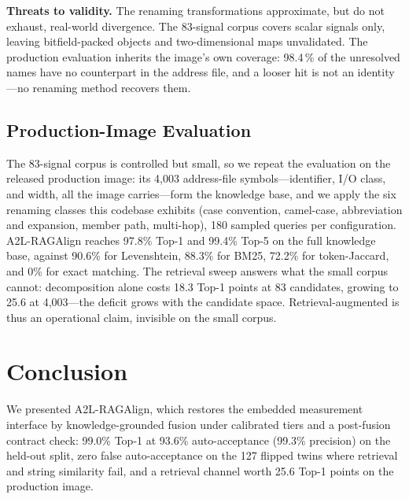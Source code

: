 \documentclass[conference]{IEEEtran}
\newcommand{\toolname}{A2L-RAGAlign}
\begin{document}
\textbf{Threats to validity.} The renaming transformations approximate, but do
not exhaust, real-world divergence. The 83-signal corpus covers scalar signals
only, leaving bitfield-packed objects and two-dimensional maps unvalidated.
The production evaluation inherits the image's own coverage: 98.4\,\% of the
unresolved names have no counterpart in the address file, and a looser hit is
not an identity---no renaming method recovers them.

\subsection{Production-Image Evaluation}
\label{sec:prod}
The 83-signal corpus is controlled but small, so we repeat the evaluation on
the released production image: its 4{,}003 address-file symbols---identifier,
I/O class, and width, all the image carries---form the knowledge base, and we
apply the six renaming classes this codebase exhibits (case convention,
camel-case, abbreviation and expansion, member path, multi-hop), 180 sampled
queries per configuration. \toolname{}
reaches 97.8\% Top-1 and 99.4\% Top-5 on the full knowledge base, against
90.6\% for Levenshtein, 88.3\% for BM25, 72.2\% for token-Jaccard, and 0\% for
exact matching. The retrieval sweep answers what the small corpus cannot:
decomposition alone costs 18.3 Top-1 points at 83 candidates, growing to 25.6
at 4{,}003---the deficit grows with the candidate space. Retrieval-augmented
is thus an operational claim, invisible on the small corpus.

\section{Conclusion}
\label{sec:conclusion}
We presented \toolname{}, which restores the embedded measurement interface by
knowledge-grounded fusion under calibrated tiers and a post-fusion contract
check: 99.0\% Top-1 at 93.6\% auto-acceptance (99.3\% precision) on the
held-out split, zero false auto-acceptance on the 127 flipped twins where
retrieval and string similarity fail, and a retrieval channel worth 25.6
Top-1 points on the production image.
\end{document}
